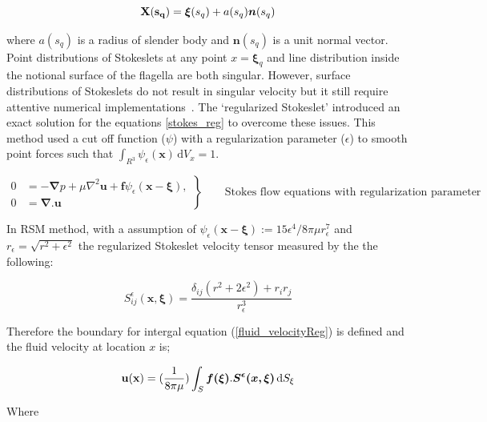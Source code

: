 \documentclass[12pt,a4paper,titlepage]{report}
\begin{document}
\begin{equation}
\bold {X(s_q)} = \bm{\xi}(s_q) + a(s_q) \bm{n}(s_q)
\label{centreline}
\end{equation}

where $a(s_q)$ is a radius of slender body and $\bm{n}(s_q)$ is a unit normal vector. Point distributions of 
Stokeslets at any point $x = \bm{\xi}_q$ and line distribution inside the notional surface
of the flagella are both singular. However, surface distributions of Stokeslets do not result in singular  velocity
 but it still require attentive numerical implementations~\citep{smith2009boundary}. The \lq{regularized Stokeslet}\rq{}
 introduced an exact solution for the equations \ref{stokes_reg} to overcome these issues. 
This method used a cut off function ($\psi$) with a regularization parameter ($\epsilon$) to smooth point forces 
such that $\int_{R^3} \psi_{\epsilon} (\bm{x})\, \mathrm{d}V_x = 1$.



\begin{equation}
 \left.\begin{aligned}
        0 &= - \bm{\nabla} p + \mu \nabla ^ 2 \bm{u} + \bm{f} \psi_\epsilon (\bm{x} - \bm{\xi}), \\
        0 &=\bm{\nabla . u}
       \end{aligned}
 \right\}
 \qquad \text{Stokes flow equations with regularization parameter}
\label{stokes_reg}
\end{equation}

In RSM method, with a assumption of $\psi_{\epsilon}(\bm{x} - \bm{\xi}) := 15\epsilon^4 /8\pi \mu r_{\epsilon}^7$ 
and $r_{\epsilon} = \sqrt{r^2 + \epsilon ^2}$ the regularized Stokeslet velocity tensor measured by the the following:


\begin{equation}
 S _{ij}^{\epsilon} \bm{(x , \xi)} = \frac{\delta _{ij}(r^2 + 2{\epsilon}^2) + r_i r_j}{r_{\epsilon}^3}
\label{velocity-tensor}
\end{equation}

Therefore the boundary for intergal equation (\ref{fluid_velocityReg}) is defined and the fluid velocity at location $x$ is;

\begin{equation}
\bold {u(x)} =(\frac{1}{8 \pi \mu}) \int_S \mathrm \bm{f(\xi)} . \bm{S^{\epsilon}( x, \xi)}\, \mathrm{d}S_{\xi}
\label{fluid_velocityReg}
\end{equation}

Where 
\end{document}

